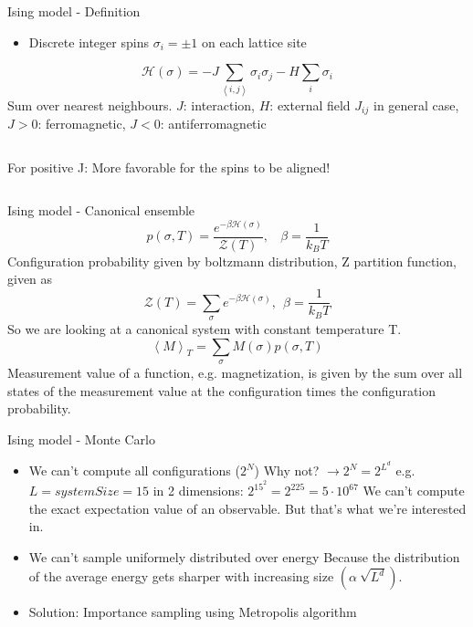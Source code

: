 \documentclass[]{beamer}
\begin{document}
\begin{frame}{Ising model - Definition}
\begin{itemize}
	 {Lattice with \(N\) sites.}
\item<2-> Discrete integer spins \( \sigma_i = \pm 1 \) on each lattice site
\end{itemize}
\pause[3]
\[ \mathscr{H}(\sigma) = -J \sum\limits_{\left< i, j \right>} \sigma_i \sigma_j - H \sum\limits_i \sigma_i \]
	 {Sum over nearest neighbours.}
	 {\( J \): interaction, \( H \): external field}
	 {\( J_{ij} \) in general case, \( J>0 \): ferromagnetic, \( J<0 \): antiferromagnetic}

\begin{columns}[c]
	\pause
	\def\svgwidth{.5\textwidth}
	\centering
	
	\pause
	\def\svgwidth{.5\textwidth}
	\centering
	
		 {For positive J: More favorable for the spins to be aligned!}
\end{columns}
\end{frame}

\begin{frame}{Ising model - Canonical ensemble}
\pause
\[ p(\sigma, T) = \frac{e^{-\beta \mathscr{H}(\sigma)}}{\mathscr{Z}(T)}, \ \ \ \ \beta=\frac{1}{k_B T}\]
	 {Configuration probability given by boltzmann distribution, Z partition function, given as \[ \mathscr{Z}(T) = \sum_\sigma e^{-\beta \mathscr{H}(\sigma)},\ \ \beta = \frac{1}{k_B T} \]}
	 {So we are looking at a canonical system with constant temperature T.}
\pause
\[ \left< M \right>_T = \sum_\sigma M(\sigma)p(\sigma,T) \]
	 {Measurement value of a function, e.g. magnetization, is given by the sum over all states of the measurement value at the configuration times the configuration probability.}
\end{frame}

\begin{frame}{Ising model - Monte Carlo}
\begin{itemize}
\item<2-> We can't compute all configurations (\(2^N\))
	 {Why not? \( \rightarrow 2^N = 2^{L^d} \) e.g. \( L = systemSize = 15 \) in 2 dimensions: \(2^{15^2} = 2^{225} = 5 \cdot 10^{67}\)}
	 {We can't compute the exact expectation value of an observable. But that's what we're interested in.}
\item<3-> We can't sample uniformely distributed over energy \def\svgwidth{12em} 
	 {Because the distribution of the average energy gets sharper with increasing size \(\left(\alpha \ \sqrt{L^d}\right)\).}
\item<4-> Solution: Importance sampling using Metropolis algorithm
\end{itemize}
\end{frame}
\end{document}
